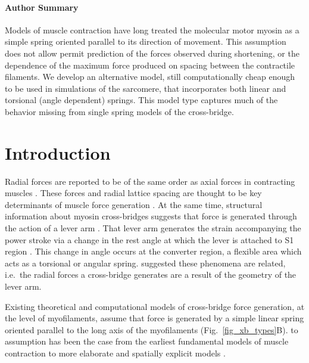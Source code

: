 \documentclass[]{article}
\begin{document}
\paragraph*{Author Summary} %
Models of muscle contraction have long treated the molecular motor myosin as a simple spring oriented parallel to its direction of movement. 
This assumption does not allow permit prediction of the forces observed during shortening, or the dependence of the maximum force produced on spacing between the contractile filaments.
We develop an alternative model, still computationally cheap enough to be used in simulations of the sarcomere, that incorporates both linear and torsional (angle dependent) springs. 
This model type captures much of the behavior missing from single spring models of the cross-bridge.


\section*{Introduction} %

Radial forces are reported to be of the same order as axial forces in contracting muscles \citep{Cecchi1990, Millman1998}. 
These forces and radial lattice spacing are thought to be key determinants of muscle force generation \citep{Fuchs2005}. 
At the same time, structural information about myosin cross-bridges suggests that force is generated through the action of a lever arm \citep{Rayment1993, Uyeda1996, Huxley2000}.
That lever arm generates the strain accompanying the power stroke via a change in the rest angle at which the lever is attached to S1 region \citep{Huxley2000, Houdusse2001}. 
This change in angle occurs at the converter region, a flexible area which acts as a torsional or angular spring. 
\citet{Schoenberg1980b} suggested these phenomena are related, i.e.\ the radial forces a cross-bridge generates are a result of the geometry of the lever arm. 

Existing theoretical and computational models of cross-bridge force generation, at the level of myofilaments, assume that force is generated by a simple linear spring oriented parallel to the long axis of the myofilaments (Fig.~\ref{fig_xb_types}B).  
to assumption has been the case from the earliest fundamental models of muscle contraction to more elaborate and spatially explicit models \citep{Huxley1957, Daniel1998, Chase2004, Tanner2007, Campbell2009}.  
\end{document}
